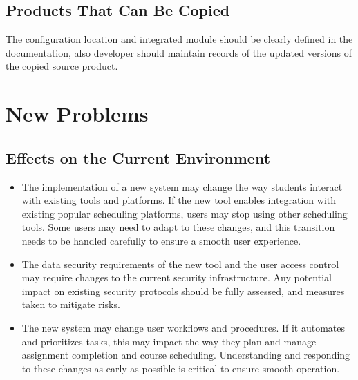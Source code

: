 \documentclass[12pt]{article}
\begin{document}
\subsection{Products That Can Be Copied}
The configuration location and integrated module should be clearly defined in the documentation, also developer should maintain records of the updated versions of the copied source product.\\


\section{New Problems}
\subsection{Effects on the Current Environment}

\begin{itemize}
    \item The implementation of a new system may change the way students interact with existing tools and platforms. If the new tool enables integration with existing popular scheduling platforms, users may stop using other scheduling tools. Some users may need to adapt to these changes, and this transition needs to be handled carefully to ensure a smooth user experience.

    \item The data security requirements of the new tool and the user access control may require changes to the current security infrastructure. Any potential impact on existing security protocols should be fully assessed, and measures taken to mitigate risks.

    \item The new system may change user workflows and procedures. If it automates and prioritizes tasks, this may impact the way they plan and manage assignment completion and course scheduling. Understanding and responding to these changes as early as possible is critical to ensure smooth operation.
\end{itemize}
\end{document}
